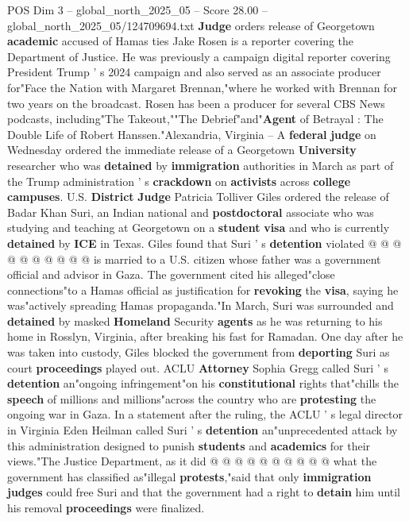 \begin{textsample}{POS Dim 3 – global\_north\_2025\_05 – Score 28.00 – global\_north\_2025\_05/124709694.txt}  \label{ex:f3_pos_133}
\textbf{Judge} orders release of Georgetown \textbf{academic} accused of Hamas ties Jake Rosen is a reporter covering the Department of Justice.
He was previously a campaign digital reporter covering President Trump ' s 2024 campaign and also served as an associate producer for"Face the Nation with Margaret Brennan,"where he worked with Brennan for two years on the broadcast.
Rosen has been a producer for several CBS News podcasts, including"The Takeout,""The Debrief"and"\textbf{Agent} of Betrayal : The Double Life of Robert Hanssen."Alexandria, Virginia -- A \textbf{federal} \textbf{judge} on Wednesday ordered the immediate release of a Georgetown \textbf{University} researcher who was \textbf{detained} by \textbf{immigration} authorities in March as part of the Trump administration ' s \textbf{crackdown} on \textbf{activists} across \textbf{college} \textbf{campuses}.
U.S. \textbf{District} \textbf{Judge} Patricia Tolliver Giles ordered the release of Badar Khan Suri, an Indian national and \textbf{postdoctoral} associate who was studying and teaching at Georgetown on a \textbf{student} \textbf{visa} and who is currently \textbf{detained} by \textbf{ICE} in Texas.
Giles found that Suri ' s \textbf{detention} violated @ @ @ @ @ @ @ @ @ @ is married to a U.S. citizen whose father was a government official and advisor in Gaza.
The government cited his alleged"close connections"to a Hamas official as justification for \textbf{revoking} the \textbf{visa}, saying he was"actively spreading Hamas propaganda."In March, Suri was surrounded and \textbf{detained} by masked \textbf{Homeland} Security \textbf{agents} as he was returning to his home in Rosslyn, Virginia, after breaking his fast for Ramadan.
One day after he was taken into custody, Giles blocked the government from \textbf{deporting} Suri as court \textbf{proceedings} played out.
ACLU \textbf{Attorney} Sophia Gregg called Suri ' s \textbf{detention} an"ongoing infringement"on his \textbf{constitutional} rights that"chills the \textbf{speech} of millions and millions"across the country who are \textbf{protesting} the ongoing war in Gaza.
In a statement after the ruling, the ACLU ' s legal director in Virginia Eden Heilman called Suri ' s \textbf{detention} an"unprecedented attack by this administration designed to punish \textbf{students} and \textbf{academics} for their views."The Justice Department, as it did @ @ @ @ @ @ @ @ @ @ what the government has classified as"illegal \textbf{protests},"said that only \textbf{immigration} \textbf{judges} could free Suri and that the government had a right to \textbf{detain} him until his removal \textbf{proceedings} were finalized.

\end{textsample}
